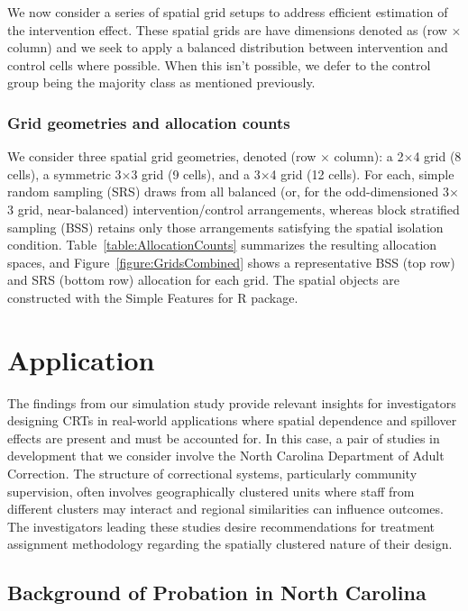 \documentclass{article}[11pt]
\begin{document}
We now consider a series of spatial grid setups to address efficient estimation of the intervention effect. These spatial grids are have dimensions denoted as (row $\times$ column) and we seek to apply a balanced distribution between intervention and control cells where possible. When this isn't possible, we defer to the control group being the majority class as mentioned previously.

\subsubsection{Grid geometries and allocation counts}

We consider three spatial grid geometries, denoted (row $\times$ column): a 2$\times$4 grid (8 cells), a symmetric 3$\times$3 grid (9 cells), and a 3$\times$4 grid (12 cells). For each, simple random sampling (SRS) draws from all balanced (or, for the odd-dimensioned 3$\times$3 grid, near-balanced) intervention/control arrangements, whereas block stratified sampling (BSS) retains only those arrangements satisfying the spatial isolation condition. Table~\ref{table:AllocationCounts} summarizes the resulting allocation spaces, and Figure~\ref{figure:GridsCombined} shows a representative BSS (top row) and SRS (bottom row) allocation for each grid. The spatial objects are constructed with the Simple Features for R package\cite{pebesma_simple_2018}\cite{pebesma_spatial_2023}.

\section{Application}

The findings from our simulation study provide relevant insights for investigators designing CRTs in real-world applications where spatial dependence and spillover effects are present and must be accounted for. In this case, a pair of studies in development that we consider involve the North Carolina Department of Adult Correction. The structure of correctional systems, particularly community supervision, often involves geographically clustered units where staff from different clusters may interact and regional similarities can influence outcomes. The investigators leading these studies desire recommendations for treatment assignment methodology regarding the spatially clustered nature of their design.

\subsection{Background of Probation in North Carolina}
\end{document}
